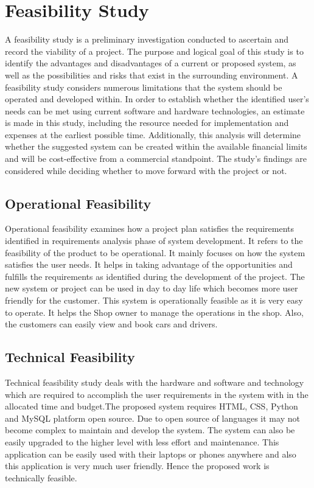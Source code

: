 \documentclass[a4paper,12pt,toc=flat]{report}
\begin{document}
{	           	\section{Feasibility Study}
	           	\hspace*{12pt}A feasibility study is a preliminary investigation conducted to ascertain and record the viability of a project. The purpose and logical goal of this study is to identify the advantages and disadvantages of a current or proposed system, as well as the possibilities and risks that exist in the surrounding environment. A feasibility study considers numerous limitations that the system should be operated and developed within. In order to establish whether the identified user's needs can be met using current software and hardware technologies, an estimate is made in this study, including the resource needed for implementation and expenses at the earliest possible time. Additionally, this analysis will determine whether the suggested system can be created within the available financial limits and will be cost-effective from a commercial standpoint. The study's findings are considered while deciding whether to move forward with the project or not.
	           	\\
	\subsection{Operational Feasibility}
	\hspace*{12pt}Operational feasibility examines how a project plan satisfies the requirements identified in requirements analysis phase of system development. It refers to the feasibility of the product to be operational. It mainly focuses on how the system satisfies the user needs. It helps in taking advantage of the opportunities and fulfills the requirements as identified during the development of the project. The new system or project can be used in day to day life which becomes more user friendly for the customer. This system is operationally feasible as it is very easy to operate. It helps the Shop owner to manage the operations in the shop. Also, the customers can easily view and book cars and drivers. 
	\\
		\subsection{Technical Feasibility}
	\hspace*{12pt}Technical feasibility study deals with the hardware and software and technology which are required to accomplish the user requirements in the system with in the allocated time and budget.The proposed system requires HTML, CSS, Python and MySQL platform   open source. Due to open source of languages it may not become complex to maintain and develop the system. The system can also be easily upgraded to the higher level with less effort and maintenance. This application can be easily used with their laptops or phones anywhere and also this application is very much user friendly. Hence the proposed work is technically feasible.
	\\
}
\end{document}
